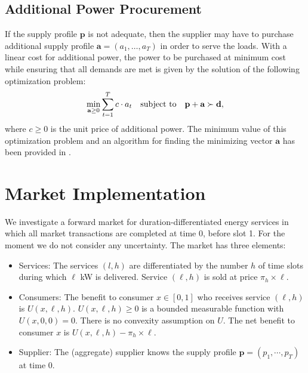 \documentclass[10pt,draftcls,onecolumn]{IEEEtran}
\let \VEC \mathbf
\let \morethan \succ
\newcounter{l1}
\newcounter{l2}
\newcounter{l3}
\begin{document}
\subsection{Additional Power Procurement}
If the supply profile $\VEC p$ is not adequate, then the supplier may have to purchase additional supply profile $\VEC a = (a_1,\ldots,a_T)$ in order to serve the loads. 
With a linear cost for  additional power, the  power to be purchased at minimum cost while ensuring that all demands are met is given by the solution of the following optimization problem:
\begin{equation}
    \min_{\VEC a \geq 0} \sum_{t=1}^T c \cdot a_t \notag \quad
    \mbox{subject to~~~} \VEC p + \VEC a \morethan \VEC d, \label{LP}
\end{equation}
where $c \geq 0$ is the unit price of additional power.  The minimum value of this optimization problem and an algorithm for finding the minimizing vector $\VEC a$ has been provided in \cite{dd2013}.









\section{Market Implementation}\label{sec-market}

We investigate a forward market for duration-differentiated energy services in which  all market transactions are completed at time 0, before slot 1. For the moment we do not consider any uncertainty.  The market has three elements:

\begin{itemize}

\item Services: The services $(l,h)$ are differentiated by the number $h$ of time slots during which $\ell$ kW  is delivered.  Service $(\ell, h)$ is sold at price $\pi_h \times \ell$.

\item Consumers:  The benefit to consumer $x \in [0,1]$ who receives service $(\ell, h)$ is  $U(x,\ell,h)$.  $U(x, \ell, h) \ge 0$ is a bounded measurable function with $U(x,0,0) = 0$.  There is no convexity assumption on $U$.  The net benefit to consumer $x$ is $U(x, \ell, h) - \pi_h \times \ell$.


\item Supplier: The (aggregate) supplier knows the  supply profile $\VEC p = (p_1, \cdots, p_T)$ at time 0. 


\end{itemize}
\end{document}
